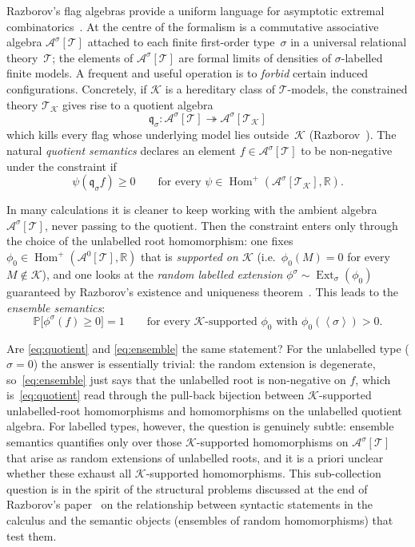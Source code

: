 \documentclass[11pt]{article}
\theoremstyle{definition}
\newcommand{\R}{\mathbb{R}}
\newcommand{\Prob}{\mathbb{P}}
\newcommand{\A}{\mathcal{A}}
\newcommand{\K}{\mathcal{K}}
\newcommand{\T}{\mathcal{T}}
\newcommand{\Homp}{\operatorname{Hom}^{+}}
\newcommand{\Ext}{\operatorname{Ext}}
\newcommand{\brak}[1]{\left\langle #1\right\rangle}
\newcommand{\q}{\mathfrak{q}}
\begin{document}
Razborov's flag algebras provide a uniform language for asymptotic
extremal combinatorics~\cite{Razborov2007}.  At the centre of the
formalism is a commutative associative algebra $\A^\sigma[\T]$ attached to
each finite first-order type~$\sigma$ in a universal relational theory~$\T$;
the elements of $\A^\sigma[\T]$ are formal limits of densities of
$\sigma$-labelled finite models.  A frequent and useful operation is to
\emph{forbid} certain induced configurations.  Concretely, if $\K$ is a
hereditary class of $\T$-models, the constrained theory $\T_\K$ gives rise
to a quotient algebra
\[
  \q_\sigma : \A^\sigma[\T] \twoheadrightarrow \A^\sigma[\T_\K]
\]
which kills every flag whose underlying model lies outside~$\K$
(Razborov~\cite[\S2.3.3]{Razborov2007}).  The natural \emph{quotient
semantics} declares an element $f\in\A^\sigma[\T]$ to be non-negative
under the constraint if
\begin{equation}\label{eq:quotient}
  \psi(\q_\sigma f)\ge 0
  \qquad\text{for every }\psi\in\Homp(\A^\sigma[\T_\K],\R).
\end{equation}

In many calculations it is cleaner to keep working with the ambient
algebra $\A^\sigma[\T]$, never passing to the quotient.  Then the
constraint enters only through the choice of the unlabelled root
homomorphism: one fixes
$\phi_0\in\Homp(\A^0[\T],\R)$ that is \emph{supported on $\K$}
(i.e.\ $\phi_0(M)=0$ for every $M\notin\K$), and one looks at the
\emph{random labelled extension} $\phi^\sigma\sim\Ext_\sigma(\phi_0)$
guaranteed by Razborov's existence and uniqueness
theorem~\cite[Theorem~3.5]{Razborov2007}.  This leads to the
\emph{ensemble semantics}:
\begin{equation}\label{eq:ensemble}
  \Prob\bigl[\phi^\sigma(f)\ge 0\bigr]=1
  \qquad\text{for every $\K$-supported $\phi_0$ with $\phi_0(\brak\sigma)>0$.}
\end{equation}

Are \eqref{eq:quotient} and \eqref{eq:ensemble} the same statement?
For the unlabelled type ($\sigma=0$) the answer is essentially trivial:
the random extension is degenerate, so~\eqref{eq:ensemble} just says
that the unlabelled root is non-negative on $f$, which is~\eqref{eq:quotient}
read through the pull-back bijection between $\K$-supported
unlabelled-root homomorphisms and homomorphisms on the unlabelled
quotient algebra.  For labelled types, however, the question is
genuinely subtle: ensemble semantics quantifies only over those
$\K$-supported homomorphisms on $\A^\sigma[\T]$ that arise as random
extensions of unlabelled roots, and it is a priori unclear whether
these exhaust all $\K$-supported homomorphisms.  This sub-collection
question is in the spirit of the structural problems discussed at the
end of Razborov's paper~\cite[\S6]{Razborov2007} on the relationship
between syntactic statements in the calculus and the semantic objects
(ensembles of random homomorphisms) that test them.
\end{document}
